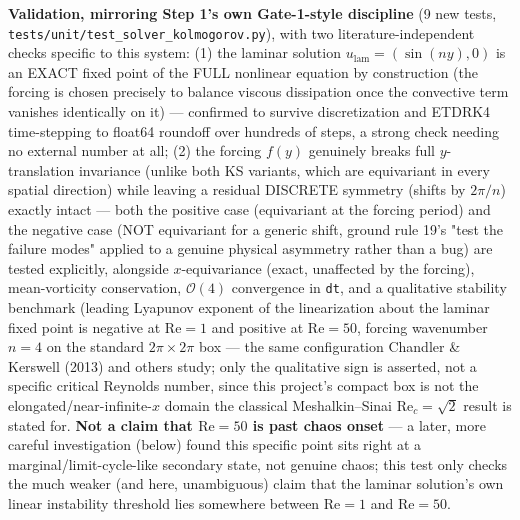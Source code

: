 \documentclass[11pt]{article}
\begin{document}
\textbf{Validation, mirroring Step 1's own Gate-1-style discipline}
(9 new tests, \texttt{tests/unit/test\_solver\_kolmogorov.py}), with two
literature-independent checks specific to this system: (1) the laminar
solution $u_{\mathrm{lam}}=(\sin(ny),0)$ is an EXACT fixed point of the
FULL nonlinear equation by construction (the forcing is chosen precisely
to balance viscous dissipation once the convective term vanishes
identically on it) --- confirmed to survive discretization and ETDRK4
time-stepping to float64 roundoff over hundreds of steps, a strong check
needing no external number at all; (2) the forcing $f(y)$ genuinely
breaks full $y$-translation invariance (unlike both KS variants, which
are equivariant in every spatial direction) while leaving a residual
DISCRETE symmetry (shifts by $2\pi/n$) exactly intact --- both the
positive case (equivariant at the forcing period) and the negative case
(NOT equivariant for a generic shift, ground rule 19's "test the failure
modes" applied to a genuine physical asymmetry rather than a bug) are
tested explicitly, alongside $x$-equivariance (exact, unaffected by the
forcing), mean-vorticity conservation, $\mathcal{O}(4)$ convergence in
\texttt{dt}, and a qualitative stability benchmark (leading Lyapunov
exponent of the linearization about the laminar fixed point is negative
at $\mathrm{Re}=1$ and positive at $\mathrm{Re}=50$, forcing wavenumber
$n=4$ on the standard $2\pi\times2\pi$ box --- the same configuration
Chandler \& Kerswell (2013) and others study; only the qualitative sign
is asserted, not a specific critical Reynolds number, since this
project's compact box is not the elongated/near-infinite-$x$ domain the
classical Meshalkin--Sinai $\mathrm{Re}_c=\sqrt2$ result is stated for.
\textbf{Not a claim that $\mathrm{Re}=50$ is past chaos onset} --- a
later, more careful investigation (below) found this specific point sits
right at a marginal/limit-cycle-like secondary state, not genuine chaos;
this test only checks the much weaker (and here, unambiguous) claim that
the laminar solution's own linear instability threshold lies somewhere
between $\mathrm{Re}=1$ and $\mathrm{Re}=50$.
\end{document}
